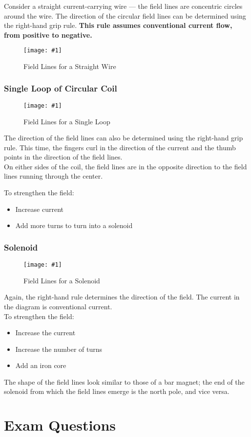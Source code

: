 \documentclass[a4paper,12pt]{article}
\let\oldsection\section
\renewcommand\section{\clearpage\oldsection}
\newcommand{\lb}{\\[8pt]}
\newcommand{\img}[4]{\begin{center}
  \begin{figure}[H]
    \centering
    \texttt{[image: \#1]}
    \caption{#3}
    \label{fig:#4}
  \end{figure}
\end{center}}
\begin{document}
Consider a straight current-carrying wire --- the field lines are concentric circles around the wire. The direction of the circular field lines can be determined using the right-hand grip rule. \textbf{This rule assumes conventional current flow, from positive to negative.}

\img{straightwire.jpg}{0.5}{Field Lines for a Straight Wire}{straightwire}

\subsubsection{Single Loop of Circular Coil}

\img{singleloop.png}{0.7}{Field Lines for a Single Loop}{singleloop}

The direction of the field lines can also be determined using the right-hand grip rule. This time, the fingers curl in the direction of the current and the thumb points in the direction of the field lines.\lb
On either sides of the coil, the field lines are in the opposite direction to the field lines running through the center.

To strengthen the field:
\begin{itemize}
  \item Increase current
  \item Add more turns to turn into a solenoid
\end{itemize}

\pagebreak

\subsubsection{Solenoid}

\img{solenoid.jpg}{0.9}{Field Lines for a Solenoid}{solenoid}

Again, the right-hand rule determines the direction of the field. The current in the diagram is conventional current.\lb
To strengthen the field:
\begin{itemize}
  \item Increase the current
  \item Increase the number of turns
  \item Add an iron core
\end{itemize}
The shape of the field lines look similar to those of a bar magnet; the end of the solenoid from which the field lines emerge is the north pole, and vice versa.

\section{Exam Questions}
\end{document}
